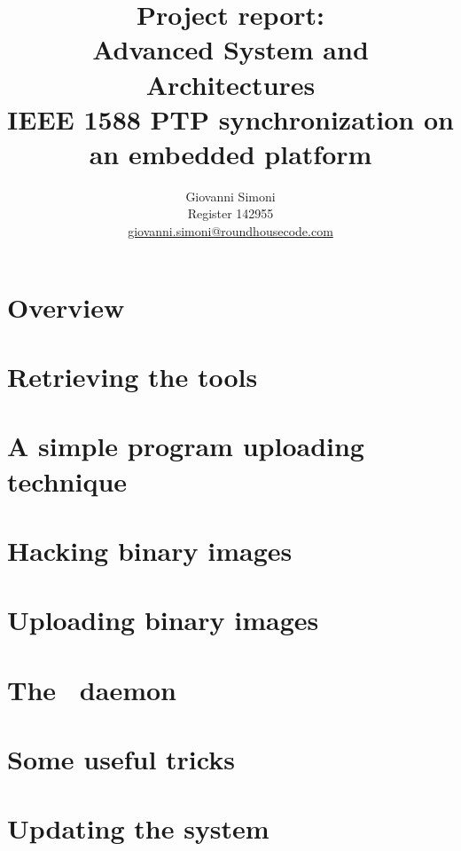 \documentclass[10pt,a4paper]{article}
\title {
    Project report:\\
    Advanced System and Architectures\\
    IEEE 1588 PTP synchronization on an embedded platform
}
\author{
    Giovanni Simoni\\
    Register 142955\\
    \href{mailto:giovanni.simoni@roundhousecode.com}
         {giovanni.simoni@roundhousecode.com}
}
\begin{document}
\maketitle

%
%
%
    \tableofcontents
    \newpage

    \section{ Overview } \label{sec:Overview}
    

    \section{ Retrieving the tools } \label{sec:GetTools}
    

    \section{ A simple program uploading technique } \label{sec:Upload}
    

    \section{ Hacking binary images } \label{sec:HackImages}
    

    \section{ Uploading binary images } \label{sec:UploadImages}
    

    \section{ The \PTP\ daemon } \label{sec:PTPd}

    \section{ Some useful tricks } \label{sec:Tricks}
    

    \section{ Updating the system } \label{sec:Update}
\end{document}
